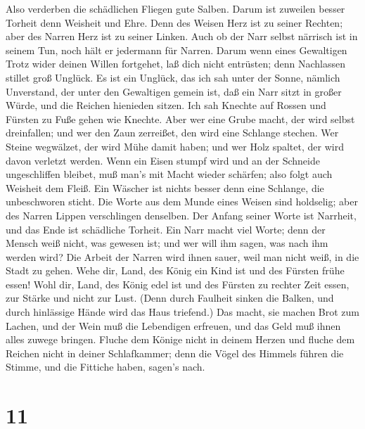  Also verderben die schädlichen Fliegen gute Salben. Darum
ist zuweilen besser Torheit denn Weisheit und Ehre.  Denn
des Weisen Herz ist zu seiner Rechten; aber des Narren Herz ist zu
seiner Linken.  Auch ob der Narr selbst närrisch ist in
seinem Tun, noch hält er jedermann für Narren.  Darum wenn
eines Gewaltigen Trotz wider deinen Willen fortgehet, laß dich nicht
entrüsten; denn Nachlassen stillet groß Unglück.  Es ist ein
Unglück, das ich sah unter der Sonne, nämlich Unverstand, der unter den
Gewaltigen gemein ist,  daß ein Narr sitzt in großer Würde,
und die Reichen hienieden sitzen.  Ich sah Knechte auf
Rossen und Fürsten zu Fuße gehen wie Knechte.  Aber wer eine
Grube macht, der wird selbst dreinfallen; und wer den Zaun zerreißet,
den wird eine Schlange stechen.  Wer Steine wegwälzet, der
wird Mühe damit haben; und wer Holz spaltet, der wird davon verletzt
werden.  Wenn ein Eisen stumpf wird und an der Schneide
ungeschliffen bleibet, muß man's mit Macht wieder schärfen; also folgt
auch Weisheit dem Fleiß.  Ein Wäscher ist nichts besser
denn eine Schlange, die unbeschworen sticht.  Die Worte aus
dem Munde eines Weisen sind holdselig; aber des Narren Lippen
verschlingen denselben.  Der Anfang seiner Worte ist
Narrheit, und das Ende ist schädliche Torheit.  Ein Narr
macht viel Worte; denn der Mensch weiß nicht, was gewesen ist; und wer
will ihm sagen, was nach ihm werden wird?  Die Arbeit der
Narren wird ihnen sauer, weil man nicht weiß, in die Stadt zu gehen.
 Wehe dir, Land, des König ein Kind ist und des Fürsten
frühe essen!  Wohl dir, Land, des König edel ist und des
Fürsten zu rechter Zeit essen, zur Stärke und nicht zur Lust.
 (Denn durch Faulheit sinken die Balken, und durch
hinlässige Hände wird das Haus triefend.)  Das macht, sie
machen Brot zum Lachen, und der Wein muß die Lebendigen erfreuen, und
das Geld muß ihnen alles zuwege bringen.  Fluche dem Könige
nicht in deinem Herzen und fluche dem Reichen nicht in deiner
Schlafkammer; denn die Vögel des Himmels führen die Stimme, und die
Fittiche haben, sagen's nach.

\hypertarget{section-10}{%
\section{11}\label{section-10}}


